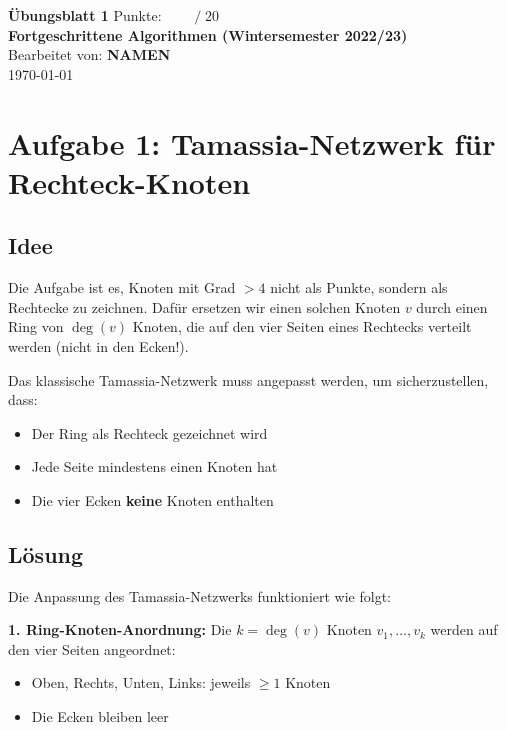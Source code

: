 \documentclass[a4paper]{scrartcl}
\def\sheetNumber{1}
\def\names{NAMEN}
\def\sumPoints{20}
\begin{document}
 

\begin{doublespace} %
\noindent \textbf{\LARGE{Übungsblatt \sheetNumber}}
\hfill  {\large Punkte: $\boxed{\qquad  /\; \sumPoints}$}\\
{\Large \textbf{Fortgeschrittene Algorithmen (Wintersemester 2022/23)}\\
Bearbeitet von: \textbf{\names}\\
\today}
\end{doublespace}


\section*{Aufgabe 1: Tamassia-Netzwerk für Rechteck-Knoten}

\subsection*{Idee}

Die Aufgabe ist es, Knoten mit Grad $> 4$ nicht als Punkte, sondern als Rechtecke zu zeichnen. Dafür ersetzen wir einen solchen Knoten $v$ durch einen Ring von $\deg(v)$ Knoten, die auf den vier Seiten eines Rechtecks verteilt werden (nicht in den Ecken!).

Das klassische Tamassia-Netzwerk muss angepasst werden, um sicherzustellen, dass:
\begin{itemize}
    \item Der Ring als Rechteck gezeichnet wird
    \item Jede Seite mindestens einen Knoten hat
    \item Die vier Ecken \textbf{keine} Knoten enthalten
\end{itemize}

\subsection*{Lösung}

Die Anpassung des Tamassia-Netzwerks funktioniert wie folgt:

\textbf{1. Ring-Knoten-Anordnung:}
Die $k = \deg(v)$ Knoten $v_1, \ldots, v_k$ werden auf den vier Seiten angeordnet:
\begin{itemize}
    \item Oben, Rechts, Unten, Links: jeweils $\geq 1$ Knoten
    \item Die Ecken bleiben leer
\end{itemize}
\end{document}
